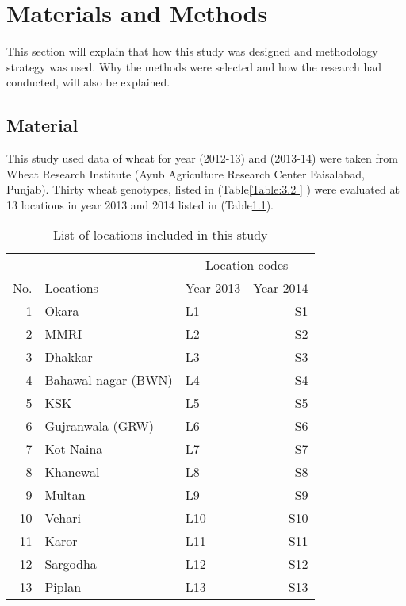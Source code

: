 \chapter{Materials and Methods}\label{material_chapter}
This section will explain that how this study was designed and methodology strategy
was used. Why the methods were selected and how the research had conducted, will
also be explained.
\section{Material}
This study used data of wheat for year (2012-13) and (2013-14) were taken from Wheat Research Institute (Ayub Agriculture Research Center Faisalabad, Punjab). Thirty wheat genotypes, listed in (Table\ref{Table:3.2 } ) were evaluated at 13 locations in year 2013 and 2014 listed in (Table\ref{Table:3.1 }).
\begin{table}[h!]
	\centering
	\caption[List of locations]{List of locations included in this study }
	
	\begin{tabular}{ r l l r} 
		\toprule
		&	&\multicolumn{2}{c}{Location codes} 
		\\
		\cmidrule(l){3-4}  
		No.& Locations                     & Year-2013    & Year-2014\\ [0.5ex] 	\hline
		\midrule 
		1  & Okara                         & L1  & S1 \\
		2  & MMRI                          & L2  & S2\\
		3  & Dhakkar                       & L3  & S3\\
		4  & Bahawal nagar (BWN)           & L4  & S4 \\
		5  &  KSK                          & L5  & S5\\
		6  &  Gujranwala   (GRW)           & L6  & S6\\
		7  &   Kot Naina                   & L7  & S7\\
		8  &    Khanewal                   & L8  & S8\\
		9  &    Multan                     & L9  & S9 \\
		10  &    Vehari                    & L10 & S10 \\
		11 &    Karor                      & L11 & S11\\
		12 &    Sargodha                   & L12 & S12 \\
		13 &    Piplan                     & L13 & S13\\
		
		\bottomrule
	\end{tabular}
	\label{Table:3.1 }
\end{table}

